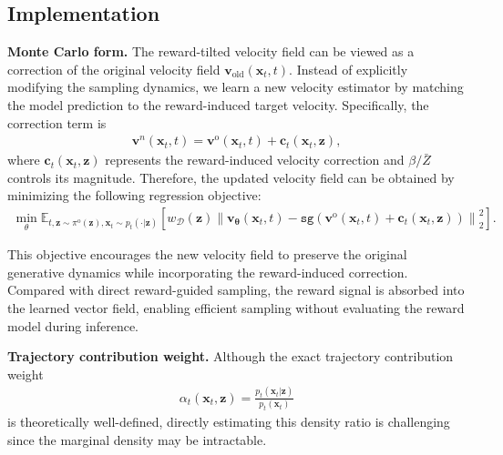 \documentclass{article} %
\begin{document}
\subsection{Implementation}
\noindent\textbf{Monte Carlo form.}
The reward-tilted velocity field can be viewed as a correction of the
original velocity field $\mathbf v_{\mathrm{old}}(\mathbf x_t,t)$.
Instead of explicitly modifying the sampling dynamics, we learn a new
velocity estimator by matching the model prediction to the reward-induced
target velocity. Specifically, the correction term is 
\begin{align}
\mathbf v^n(\mathbf x_t,t)
=
\mathbf v^{\mathrm{o}}(\mathbf x_t,t)
+ 
\mathbf c_t(\mathbf x_t,\mathbf z),
\end{align}
where $\mathbf c_t(\mathbf x_t,\mathbf z)$ represents the reward-induced
velocity correction and $\beta/\bar Z$ controls its magnitude. Therefore,
the updated velocity field can be obtained by minimizing the following
regression objective:
\begin{align}
\min_{\theta}
\mathbb{E}_{t, \mathbf z\sim\pi^{\mathrm{o}}(\mathbf z),\mathbf x_t\sim p_t(\cdot|\mathbf z)}
\left[
w_{\mathcal D}(\mathbf z)
\left\|
\mathbf v_{\boldsymbol{\theta}}(\mathbf x_t,t)
-
\mathtt{sg}(
\mathbf v^{\mathrm{o}}(\mathbf x_t,t)
+ 
\mathbf c_t(\mathbf x_t,\mathbf z))
\right\|_2^2
\right].
\end{align}

This objective encourages the new velocity field to preserve the original
generative dynamics while incorporating the reward-induced correction.
Compared with direct reward-guided sampling, the reward signal is absorbed
into the learned vector field, enabling efficient sampling without
evaluating the reward model during inference.


\noindent\textbf{\color{red}Trajectory contribution weight.}
Although the exact trajectory contribution weight
\begin{align}
\alpha_t(\mathbf{x}_t,\mathbf z)
=
\frac{
p_t(\mathbf{x}_t|\mathbf z)
}
{
p_t(\mathbf{x}_t)
}
\end{align}
is theoretically well-defined, directly estimating this density ratio is
challenging since the marginal
density may be intractable. 
\end{document}
